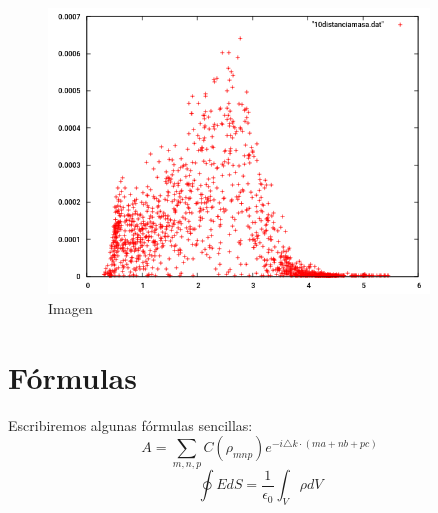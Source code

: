 \documentclass[a4paper]{article}
\begin{document}
\begin{figure}[H]
\includegraphics[width=0.9\textwidth]{10distanciamasa.png}
\caption{Imagen}
\end{figure}
\section{Fórmulas}
Escribiremos algunas fórmulas sencillas:
$$A=\sum_{m,n,p}C(\rho_{mnp})e^{-i\triangle k\cdot(ma+nb+pc)}$$
$$\oint{EdS}= \frac{1}{\epsilon_0}\int_V{\rho dV} $$
\newpage
\printbibliography
\end{document}
